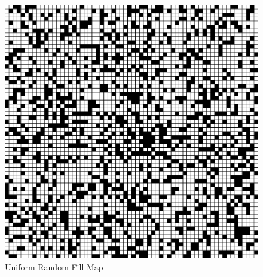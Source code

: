 \clearpage

\begin{figure}[h!]
    \centering
    \includegraphics[scale=0.82]{images/m1.png}
    \caption{Uniform Random Fill Map}
    \label{fig: rep_Uniform Random Fill Map}
\end{figure}


